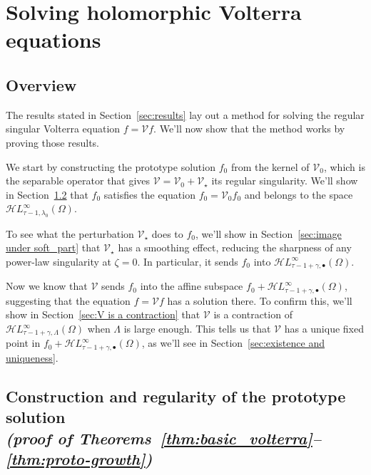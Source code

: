 \documentclass{article}
\theoremstyle{plain}
\newcommand{\singexp}[2]{\mathcal{H}L^\infty_{#1, #2}}
\newcommand{\singexpalg}[1]{\singexp{#1}{\bullet}}
\newcommand{\volterra}{\mathcal{V}}
\newcommand{\hardpart}{\mathcal{V}_0}
\newcommand{\softpart}{\mathcal{V}_\star}
\newcommand{\solwhole}{f}
\newcommand{\solproto}{f_0}
\newcommand{\domain}{\Omega}
\begin{document}
\section{Solving holomorphic Volterra equations}\label{sec:proof_main_results}
\subsection{Overview}
The results stated in Section~\ref{sec:results} lay out a method for solving the regular singular Volterra equation $\solwhole = \volterra \solwhole$. We'll now show that the method works by proving those results.

We start by constructing the prototype solution $\solproto$ from the kernel of $\hardpart$, which is the separable operator that gives $\volterra = \hardpart + \softpart$ its regular singularity. We'll show in Section~\ref{sec:proto-construction-regularity} that $\solproto$ satisfies the equation $\solproto = \hardpart \solproto$ and belongs to the space $\singexp{\tau-1}{\lambda_0}(\domain)$.

To see what the perturbation $\softpart$ does to $\solproto$, we'll show in Section~\ref{sec:image under soft_part} that $\softpart$ has a smoothing effect, reducing the sharpness of any power-law singularity at $\zeta = 0$. In particular, it sends $\solproto$ into $\singexpalg{\tau-1+\gamma}(\domain)$.

Now we know that $\volterra$ sends $\solproto$ into the affine subspace $\solproto + \singexpalg{\tau-1+\gamma}(\domain)$, suggesting that the equation $\solwhole = \volterra \solwhole$ has a solution there. To confirm this, we'll show in Section~\ref{sec:V is a contraction} that $\volterra$ is a contraction of $\singexp{\tau-1+\gamma}{\Lambda}(\domain)$ when $\Lambda$ is large enough. This tells us that $\volterra$ has a unique fixed point in $\solproto + \singexpalg{\tau-1+\gamma}(\domain)$, as we'll see in Section~\ref{sec:existence and uniqueness}.
\subsection{Construction and regularity of the prototype solution \\ \textit{(proof of Theorems~\ref{thm:basic_volterra}--\ref{thm:proto-growth})}}\label{sec:proto-construction-regularity}
\end{document}

